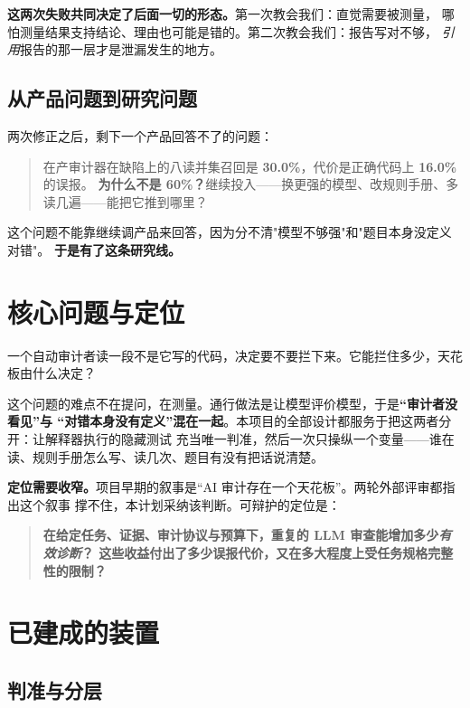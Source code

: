 \documentclass[11pt,a4paper]{article}
\begin{document}
\textbf{这两次失败共同决定了后面一切的形态。}第一次教会我们：直觉需要被测量，
哪怕测量结果支持结论、理由也可能是错的。第二次教会我们：报告写对不够，
\emph{引用}报告的那一层才是泄漏发生的地方。

\subsection{从产品问题到研究问题}

两次修正之后，剩下一个产品回答不了的问题：

\begin{quote}
在产审计器在缺陷上的八读并集召回是 \textbf{30.0\%}，代价是正确代码上 \textbf{16.0\%} 的误报。
\textbf{为什么不是 60\%？}继续投入——换更强的模型、改规则手册、多读几遍——能把它推到哪里？
\end{quote}

这个问题不能靠继续调产品来回答，因为分不清"模型不够强"和"题目本身没定义对错"。
\textbf{于是有了这条研究线。}

\section{核心问题与定位}

一个自动审计者读一段不是它写的代码，决定要不要拦下来。它能拦住多少，天花板由什么决定？

这个问题的难点不在提问，在测量。通行做法是让模型评价模型，于是\textbf{“审计者没看见”与
“对错本身没有定义”混在一起}。本项目的全部设计都服务于把这两者分开：让解释器执行的隐藏测试
充当唯一判准，然后一次只操纵一个变量——谁在读、规则手册怎么写、读几次、题目有没有把话说清楚。

\textbf{定位需要收窄。}项目早期的叙事是“AI 审计存在一个天花板”。两轮外部评审都指出这个叙事
撑不住，本计划采纳该判断。可辩护的定位是：

\begin{quote}
\textbf{在给定任务、证据、审计协议与预算下，重复的 LLM 审查能增加多少\emph{有效诊断}？
这些收益付出了多少误报代价，又在多大程度上受任务规格完整性的限制？}
\end{quote}

\section{已建成的装置}

\subsection{判准与分层}
\end{document}
